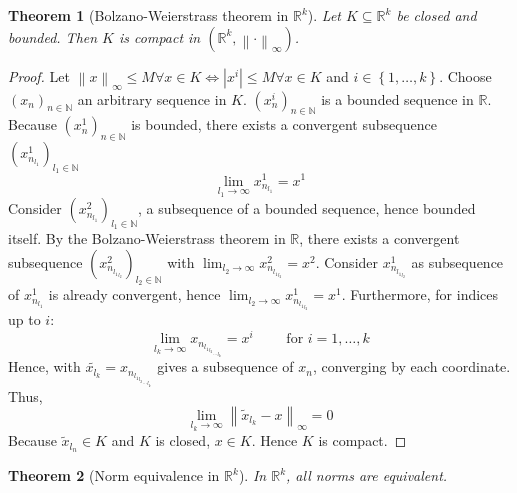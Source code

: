 \documentclass{article}
\newtheorem{theorem}{Theorem}  \numberwithin{theorem}{section}
\newcommand{\set}[1]{\left\{#1\right\}}
\newcommand{\norm}[1]{\left\|#1\right\|}
\newcommand{\card}[1]{\left|#1\right|}
\begin{document}
\begin{theorem}[Bolzano-Weierstrass theorem in $\mathbb R^k$]
  Let $K \subseteq \mathbb R^k$ be closed and bounded.
  Then $K$ is compact in $(\mathbb R^k, \norm{\cdot}_{\infty})$.
\end{theorem}

\begin{proof}
  Let $\norm{x}_{\infty} \leq M \forall x \in K \iff \card{x^i} \leq M \forall x \in K$ and $i \in \set{1, \dots, k}$.
  Choose $(x_n)_{n \in \mathbb N}$ an arbitrary sequence in $K$. $(x_n^i)_{n \in \mathbb N}$ is a bounded sequence in $\mathbb R$.
  Because $(x_n^1)_{n \in \mathbb N}$ is bounded, there exists a convergent subsequence $\left(x_{n_{l_1}}^1\right)_{l_1 \in \mathbb N}$
  \[ \lim_{l_1 \to \infty} x_{n_{l_1}}^1 = x^1 \]
  Consider $(x_{n_{l_1}}^2)_{l_1 \in \mathbb N}$, a subsequence of a bounded sequence, hence bounded itself.
  By the Bolzano-Weierstrass theorem in $\mathbb R$, there exists a convergent subsequence $(x_{n_{{l_1}_{l_2}}}^2)_{l_2 \in \mathbb N}$ with $\lim_{l_2 \to \infty} x_{n_{{l_1}_{l_2}}}^2 = x^2$.
  Consider $x_{n_{{l_1}_{l_2}}}^1$ as subsequence of $x_{n_{l_1}}^1$ is already convergent, hence $\lim_{l_2 \to \infty} x_{n_{{l_1}_{l_2}}}^1 = x^1$. Furthermore, for indices up to $i$:
  \[ \lim_{l_k \to \infty} x_{n_{{{{l_1}_{l_2}}_{\ldots}}_{l_k}}} = x^i \qquad \text{ for } i = 1, \dots, k \]
  Hence, with $\tilde{x_{l_k}} = x_{n_{{{{l_1}_{l_2}}_{\ldots}}_{l_k}}}$ gives a subsequence of $x_n$, converging by each coordinate. Thus,
  \[ \lim_{l_k \to \infty} \norm{\tilde{x}_{l_k} - x}_{\infty} = 0 \]
  Because $\tilde{x}_{l_n} \in K$ and $K$ is closed, $x \in K$.
  Hence $K$ is compact.
\end{proof}

\begin{theorem}[Norm equivalence in $\mathbb R^k$] %
  In $\mathbb R^k$, all norms are equivalent.
\end{theorem}
\end{document}
